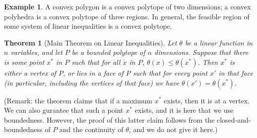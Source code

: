 \documentclass[a4paper,leqno]{article}
\numberwithin{equation}{section}
\newtheorem{thm}[equation]{Theorem}
\theoremstyle{definition}
\newtheorem{ex}[equation]{Example}
\theoremstyle{remark}
\begin{document}
\begin{ex}
  A convex polygon is a convex polytope of two dimensions; a convex polyhedra is a convex polytope of three regions. In general, the
  feasible region of some system of linear inequalities is a convex polytope.
\end{ex}

\begin{thm}[Main Theorem on Linear Inequalities]
  Let $ \theta $ be a linear function in $ n $ variables, and let $ P $ be a bounded polytope of $ n $ dimensions. Suppose that there is some point $ x^* $
  in $ P $ such that for all $ x $ in $ P $, $ \theta(x) \leq \theta(x^*) $. Then $ x^* $ is either a vertex of $ P $, or lies in a face of $ P $ such that
  for every point $ x' $ in that face (in particular, including the vertices of that face) we have $ \theta(x') = \theta(x^*) $.
\end{thm}
(Remark: the theorem claims that if a maximum $ x^* $ exists, then it is at a vertex. We can also gurantee that such a point $ x^* $ exists, and it is
here that we use boundedness. However, the proof of this latter claim follows from the closed-and-boundedness of $ P $ and the continuity of $ \theta $,
and we do not give it here.)
\end{document}
